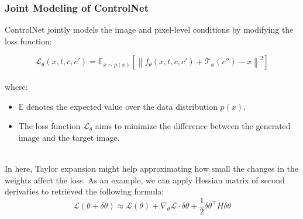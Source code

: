\documentclass[12pt]{article}
\begin{document}
\subsubsection*{Joint Modeling of ControlNet}

ControlNet jointly models the image and pixel-level conditions by modifying the loss function:

\[
\mathcal{L}_\theta(x, t, c, c') = \mathbb{E}_{x \sim p(x)} \left[ \left\| f_\theta(x, t, c, c') + \mathcal{T}_\phi(c'') - x \right\|^2 \right]
\]
\\
where:
\begin{itemize}
    \item $\mathbb{E}$ denotes the expected value over the data distribution $p(x)$.
    \item The loss function $\mathcal{L}_\theta$ aims to minimize the difference between the generated image and the target image.
\end{itemize}
\\
In here, Taylor expansion might help approximating how small the changes in the weights affect the loss. As an example, we can apply Hessian matrix of second derivaties to retrieved the following formula:
\[
    \mathcal{L}(\theta + \delta \theta) \approx \mathcal{L}(\theta) + \nabla_\theta \mathcal{L} \cdot \delta \theta + \frac{1}{2} \delta \theta^\top H \delta \theta
\]
\end{document}
